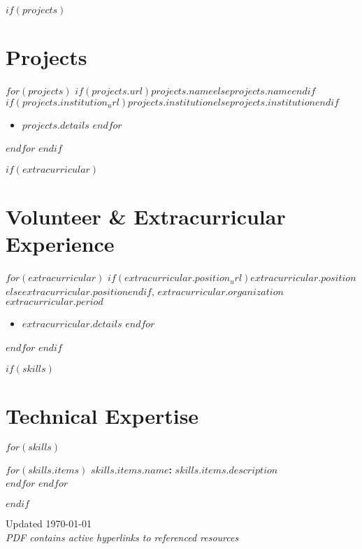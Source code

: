 \documentclass[10.5pt,a4paper]{article}
\newcommand{\daterange}[1]{\textbf{#1}}
\begin{document}
$if(projects)$
\section*{Projects}
$for(projects)$
\noindent\textbf{$if(projects.url)$\href{$projects.url$}{$projects.name$}$else$$projects.name$$endif$} \hfill \textit{$if(projects.institution_url)$\href{$projects.institution_url$}{$projects.institution$}$else$$projects.institution$$endif$}
\begin{itemize}
	$for(projects.details)$
	\item $projects.details$
	      $endfor$
\end{itemize}
\vspace{-0.1cm}
$endfor$
$endif$

$if(extracurricular)$
\section*{Volunteer \& Extracurricular Experience}
$for(extracurricular)$
\noindent\textbf{$if(extracurricular.position_url)$\href{$extracurricular.position_url$}{$extracurricular.position$}$else$$extracurricular.position$$endif$}, $extracurricular.organization$ \hfill \daterange{$extracurricular.period$}
\begin{itemize}
	$for(extracurricular.details)$
	\item $extracurricular.details$
	      $endfor$
\end{itemize}
\vspace{-0.1cm}
$endfor$
$endif$

$if(skills)$
\section*{Technical Expertise}

\begin{multicols}{2}
	$for(skills)$
	\vspace{3pt}

	$for(skills.items)$
	\noindent\textbf{$skills.items.name$:} $skills.items.description$\\[2pt]
	$endfor$
	\vspace{0.5pt}
	$endfor$
\end{multicols}
$endif$

\vfill
\begin{center}
	\footnotesize{Updated \today \\ \textit{PDF contains active hyperlinks to referenced resources}}
\end{center}
\end{document}
